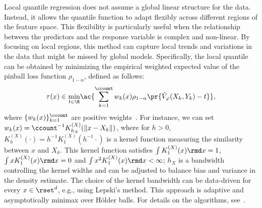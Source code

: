 \label{subsec:tau_local}
  Local quantile regression does not assume a global linear structure for the data. Instead, it allows the quantile function to adapt flexibly across different regions of the feature space. This flexibility is particularly useful when the relationship between the predictors and the response variable is complex and non-linear.
  By focusing on local regions, this method can capture local trends and variations in the data that might be missed by global models. Specifically, the local quantile can be obtained by minimizing the empirical weighted expected value of the pinball loss function \(\rho_{1-\alpha}\), defined as follows:
  \begin{equation}\label{eq:def:reg-tau}
    \tau(x) \in \underset{t\in\R}{\min} \ac{\sum_{k=1}^{\ccount} w_{k}(x) \rho_{1-\alpha}\pr{\tilde{V}_{\varphi}(X_{k},Y_{k})-t}},
  \end{equation}
  where $\{w_{k}(x)\}_{k=1}^{\ccount}$ are positive weights~\cite[Section~5.4]{wasserman2006all}.
  For instance, we can set $w_{k}(x)=\ccount^{-1} K_{h_{X}}^{(X)}(\|x-X_{k}\|)$, where for $h > 0$, $K_{h}^{(X)}(\cdot)= h^{-1} K_1^{(X)}(h^{-1} \cdot)$ is a kernel function measuring the similarity between $x$ and $X_{k}$. This kernel function satisfies $\int K^{(X)}_1(x) \rmd x=1$, $\int x K^{(X)}_1(x) \rmd x= 0$ and $\int x^2 K^{(X)}_1(x) \rmd x < \infty$; $h_{X}$ is a bandwidth controlling the kernel widths and can be adjusted to balance bias and variance in the density estimate.
  The choice of the kernel bandwidth can be data-driven for every $x \in \rset^d$, e.g., using Lepski's method. This approach is adaptive and asymptotically minimax over H\"older balls. For details on the algorithms, see~\cite{spokoiny2013local,reiss2009pointwise}.


